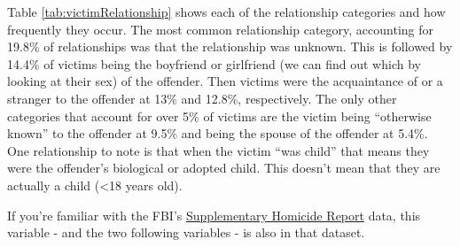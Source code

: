 \documentclass[
  12pt,
  openany]{book}
\begin{document}
Table \ref{tab:victimRelationship} shows each of the relationship categories and how frequently they occur. The most common relationship category, accounting for 19.8\% of relationships was that the relationship was unknown. This is followed by 14.4\% of victims being the boyfriend or girlfriend (we can find out which by looking at their sex) of the offender. Then victims were the acquaintance of or a stranger to the offender at 13\% and 12.8\%, respectively. The only other categories that account for over 5\% of victims are the victim being ``otherwise known'' to the offender at 9.5\% and being the spouse of the offender at 5.4\%. One relationship to note is that when the victim ``was child'' that means they were the offender's biological or adopted child. This doesn't mean that they are actually a child (\textless18 years old).

If you're familiar with the FBI's \href{https://ucrbook.com/shr.html}{Supplementary Homicide Report} data, this variable - and the two following variables - is also in that dataset.
\end{document}
